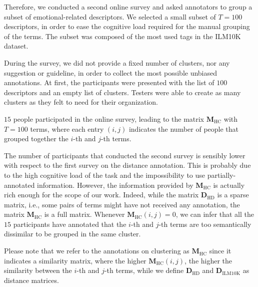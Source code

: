 Therefore, we conducted a second online survey and asked annotators to group a subset of emotional-related descriptors. We selected a small subset of $T=100$ descriptors, in order to ease the cognitive load required for the manual grouping of the terms. The subset was composed of the most used tags in the ILM10K dataset. 

During the survey, we did not provide a fixed number of clusters, nor any suggestion or guideline, in order to collect the most possible unbiased annotations. At first, the participants were presented with the list of $100$ descriptors and an empty list of clusters. Testers were able to create as many clusters as they felt to need for their organization. 

$15$ people participated in the online survey, leading to the matrix $\mathbf{M}_{\text{HC}} $ with $T=100$ terms, where each entry $(i,j)$ indicates the number of people that grouped together the $i$-th and $j$-th terms. 

The number of participants that conducted the second survey is sensibly lower with respect to the first survey on the distance annotation. This is probably due to the high cognitive load of the task and the impossibility to use partially-annotated information. However, the information provided by $\mathbf{M}_{\text{HC}}$ is actually rich enough for the scope of our work. Indeed, while the matrix $ \mathbf{D}_{\text{HD}}$ is a sparse matrix, i.e., some pairs of terms might have not received any annotation, the matrix $\mathbf{M}_{\text{HC}} $ is a full matrix. Whenever $\mathbf{M}_{\text{HC}}(i,j)=0$, we can infer that all the $15$ participants have annotated that the $i$-th and $j$-th terms are too semantically dissimilar to be grouped in the same cluster. 

Please note that we refer to the annotations on clustering as $\mathbf{M}_{\text{HC}}$ since it indicates a similarity matrix, where the higher $\mathbf{M}_{\text{HC}}(i,j)$, the higher the similarity between the $i$-th and $j$-th terms, while we define $\mathbf{D}_{\text{HD}}$ and $\mathbf{D}_{\text{ILM10K}}$ as distance matrices.


